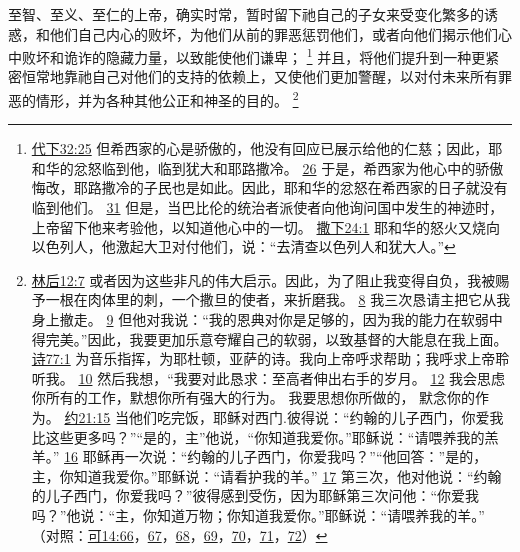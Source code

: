 \documentclass[12pt, a4paper, oneside]{ctexart}
\newcounter{parnum}[section]
\newcommand{\N}{%
   \noindent\refstepcounter{parnum}%
    \makebox[\parindent][l]{\textbf{\arabic{parnum}.}}}
\begin{document}
\N 至智、至义、至仁的上帝，确实时常，暂时留下祂自己的子女来受变化繁多的诱惑，和他们自己内心的败坏，为他们从前的罪恶惩罚他们，或者向他们揭示他们心中败坏和诡诈的隐藏力量，以致能使他们谦卑；
	\footnote {
		\href{https://biblehub.com/2_chronicles/32-25.htm}{代下32:25} 但希西家的心是骄傲的，他没有回应已展示给他的仁慈；因此，耶和华的忿怒临到他，临到犹大和耶路撒冷。
		\href{https://biblehub.com/2_chronicles/32-26.htm}{26} 于是，希西家为他心中的骄傲悔改，耶路撒冷的子民也是如此。因此，耶和华的忿怒在希西家的日子就没有临到他们。
		\href{https://biblehub.com/2_chronicles/32-31.htm}{31} 但是，当巴比伦的统治者派使者向他询问国中发生的神迹时，上帝留下他来考验他，以知道他心中的一切。
		\href{https://biblehub.com/2_samuel/24-1.htm}{撒下24:1} 耶和华的怒火又烧向以色列人，他激起大卫对付他们，说：“去清查以色列人和犹大人。”
	}
	并且，将他们提升到一种更紧密恒常地靠祂自己对他们的支持的依赖上，又使他们更加警醒，以对付未来所有罪恶的情形，并为各种其他公正和神圣的目的。
	\footnote {
		\href{https://biblehub.com/2_corinthians/12-7.htm}{林后12:7} 或者因为这些非凡的伟大启示。因此，为了阻止我变得自负，我被赐予一根在肉体里的刺，一个撒旦的使者，来折磨我。
		\href{https://biblehub.com/2_corinthians/12-8.htm}{8} 我三次恳请主把它从我身上撤走。
		\href{https://biblehub.com/2_corinthians/12-9.htm}{9} 但他对我说：“我的恩典对你是足够的，因为我的能力在软弱中得完美。”因此，我要更加乐意夸耀自己的软弱，以致基督的大能息在我上面。
		\href{https://biblehub.com/psalms/77-1.htm}{诗77:1} 为音乐指挥，为耶杜顿，亚萨的诗。我向上帝呼求帮助；我呼求上帝聆听我。
		\href{https://biblehub.com/psalms/77-10.htm}{10} 然后我想，“我要对此恳求：至高者伸出右手的岁月。
		\href{https://biblehub.com/psalms/77-12.htm}{12} 我会思虑你所有的工作，默想你所有强大的行为。
		我要思想你所做的， 默念你的作为。
		\href{https://biblehub.com/john/21-15.htm}{约21:15} 当他们吃完饭，耶稣对西门.彼得说：“约翰的儿子西门，你爱我比这些更多吗？”“是的，主”他说，“你知道我爱你。”耶稣说：“请喂养我的羔羊。”
		\href{https://biblehub.com/john/21-16.htm}{16} 耶稣再一次说：“约翰的儿子西门，你爱我吗？”“他回答：”是的，主，你知道我爱你。”耶稣说：“请看护我的羊。”
		\href{https://biblehub.com/john/21-17.htm}{17} 第三次，他对他说：“约翰的儿子西门，你爱我吗？”彼得感到受伤，因为耶稣第三次问他：“你爱我吗？”他说：“主，你知道万物；你知道我爱你。”耶稣说：“请喂养我的羊。”
		 （对照：\href{https://biblehub.com/mark/14-66.htm}{可14:66}，\href{https://biblehub.com/mark/14-67.htm}{67}，\href{https://biblehub.com/mark/14-68.htm}{68}，\href{https://biblehub.com/mark/14-69.htm}{69}，\href{https://biblehub.com/mark/14-70.htm}{70}，\href{https://biblehub.com/mark/14-71.htm}{71}，\href{https://biblehub.com/mark/14-72.htm}{72}）
	}
\end{document}
